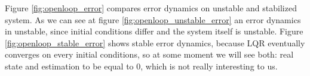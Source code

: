 \documentclass[12pt,letterpaper]{article}
\begin{document}

    
    
    Figure \ref{fig:openloop_error} compares error dynamics on unstable and stabilized system. As we can see at figure \ref{fig:openloop_unstable_error} an error dynamics in unstable, since initial conditions differ and the system itself is unstable. Figure \ref{fig:openloop_stable_error} shows stable error dynamics, because LQR eventually converges on every initial conditions, so at some moment we will see both: real state and estimation to be equal to 0, which is not really interesting to us.
    
\end{document}

